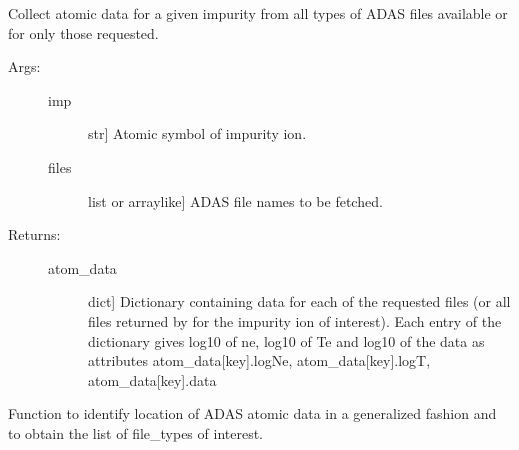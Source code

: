 \documentclass[letterpaper,10pt,english]{sphinxmanual}
\begin{document}

\begin{fulllineitems}
\label{\detokenize{aurora:aurora.atomic.get_atom_data}}
Collect atomic data for a given impurity from all types of ADAS files available or
for only those requested.
\begin{description}
\item[{Args:}] \leavevmode\begin{description}
\item[{imp}] \leavevmode{[}str{]}
Atomic symbol of impurity ion.

\item[{files}] \leavevmode{[}list or array\sphinxhyphen{}like{]}
ADAS file names to be fetched.

\end{description}

\item[{Returns:}] \leavevmode\begin{description}
\item[{atom\_data}] \leavevmode{[}dict{]}
Dictionary containing data for each of the requested files (or all files returned by
{\hyperref[\detokenize{aurora:aurora.atomic.adas_files_dict}]{}} for the impurity ion of interest). 
Each entry of the dictionary gives log\sphinxhyphen{}10 of ne, log\sphinxhyphen{}10 of Te and log\sphinxhyphen{}10 of the data
as attributes atom\_data{[}key{]}.logNe, atom\_data{[}key{]}.logT, atom\_data{[}key{]}.data

\end{description}

\end{description}

\end{fulllineitems}


\begin{fulllineitems}
\label{\detokenize{aurora:aurora.atomic.get_atomdat_info}}
Function to identify location of ADAS atomic data in a generalized fashion
and to obtain the list of file\_types of interest.

\end{fulllineitems}
\end{document}
